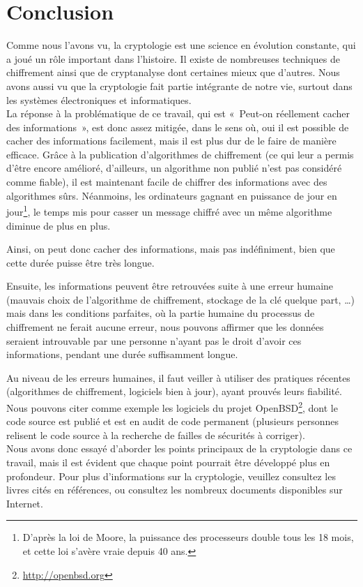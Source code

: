 \chapter{Conclusion}
\thispagestyle{empty}

Comme nous l'avons vu, la cryptologie est une science en
évolution constante, qui a joué un rôle important dans l'histoire.
Il existe de nombreuses techniques de chiffrement ainsi que de
cryptanalyse dont certaines mieux que d'autres. Nous avons aussi
vu que la cryptologie fait partie intégrante de notre vie, surtout
dans les systèmes électroniques et informatiques.
\\

La réponse à la problématique de ce travail, qui est «~Peut-on
réellement cacher des informations~», est donc assez mitigée, dans
le sens où, oui il est possible de cacher des informations
facilement, mais il est plus dur de le faire de manière efficace.
Grâce à la publication d'algorithmes de chiffrement (ce qui leur a
permis d'être encore amélioré, d'ailleurs, un algorithme non
publié n'est pas considéré comme fiable), il est maintenant facile
de chiffrer des informations avec des algorithmes sûrs. Néanmoins,
les ordinateurs gagnant en puissance de jour en jour\footnote{D'après la
loi de Moore, la puissance des processeurs double tous les 18
mois, et cette loi s'avère vraie depuis 40 ans.}, le temps mis
pour casser un message chiffré avec un même algorithme diminue de
plus en plus. %

Ainsi, on peut donc cacher des informations, mais pas
indéfiniment, bien que cette durée puisse être très longue.

Ensuite, les informations peuvent être retrouvées suite à une
erreur humaine (mauvais choix de l'algorithme de chiffrement,
stockage de la clé quelque part, …) 
mais dans les conditions parfaites, où la partie
humaine du processus de chiffrement ne ferait aucune erreur, nous
pouvons affirmer que les données seraient introuvable par une
personne n'ayant pas le droit d'avoir ces informations, pendant
une durée suffisamment longue.

Au niveau de les erreurs humaines, il faut veiller à utiliser des
pratiques récentes (algorithmes de chiffrement, logiciels bien à
jour), ayant
prouvés leurs fiabilité. Nous pouvons citer comme exemple les logiciels du
projet OpenBSD\footnote{\url{http://openbsd.org}}, dont le code
source est publié et est en audit de code permanent (plusieurs
personnes relisent le code source à la recherche de failles de
sécurités à corriger).
\\

Nous avons donc essayé d'aborder les points principaux de la
cryptologie dans ce travail, mais il est évident que chaque point
pourrait être développé plus en profondeur. Pour plus
d'informations sur la cryptologie, veuillez consultez les livres
cités en références, ou consultez les nombreux documents
disponibles sur Internet.

